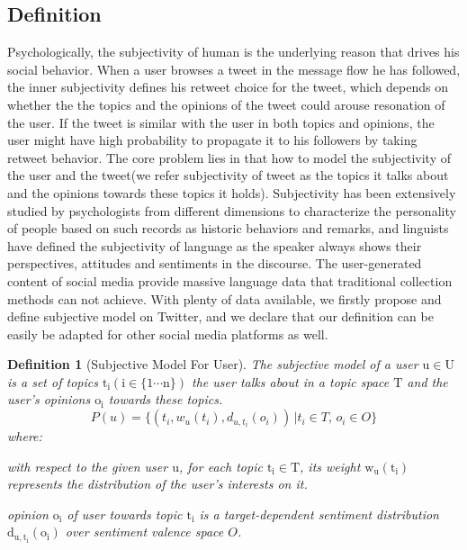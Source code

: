 \documentclass[preprint,times]{elsarticle}
\newtheorem{definition}{Definition}
\begin{document}
\subsection{Definition}
\label{definition}
Psychologically, the subjectivity of human is the underlying reason that drives his social behavior.
When a user browses a tweet in the message flow he has followed, the inner subjectivity defines his retweet choice for the tweet, which depends on whether the the topics and the opinions of the tweet could arouse resonation of the user.
If the tweet is similar with the user in both topics and opinions, the user might have high probability to propagate it to his followers by taking retweet behavior. 
The core problem lies in that how to model the subjectivity of the user and the tweet(we refer subjectivity of tweet as the topics it talks about and the opinions towards these topics it holds). 
Subjectivity has been extensively studied by psychologists from different dimensions to characterize the personality of people based on such records as historic behaviors and remarks\cite{Engbert2007}, and linguists have defined the subjectivity of language as the speaker always shows their perspectives, attitudes and sentiments in the discourse\cite{stein2005subjectivity}. 
The user-generated content of social media provide massive language data that traditional collection methods can not achieve.
With plenty of data available, we firstly propose and define subjective model on Twitter, and we declare that our definition can be easily be adapted for other social media platforms as well.
\begin{definition}[Subjective Model For User]
The subjective model of a user $\mathrm{u \in U}$ is a set of topics $\mathrm{t_{i} \left( i \in \lbrace1 \cdots n \rbrace \right) }$ 
the user talks about in a topic space $\mathrm{T}$ and the user's opinions $\mathrm{o_{i}}$ towards these topics.
\begin{equation}
\label{usermodel}
P \left( u \right) = \lbrace \left( t_{i}, w_{u} \left( t_{i} \right), d_{u,t_{i}} \left( o_{i} \right) \right) \,\vert  t_{i} \in T, \, o_{i} \in O \rbrace
\end{equation}
where:
\begin{itemize*}
\item with respect to the given user $\mathrm{u}$,  for each topic $\mathrm{t_{i} \in T}$, its  weight $\mathrm{ w_{u} \left( t_{i} \right)}$ represents the distribution of the user's interests on it.
\item opinion $\mathrm{o_{i}}$ of user towards topic $\mathrm{t_{i}}$ is a target-dependent sentiment distribution  $\mathrm{d_{u,t_{i}} \left( o_{i} \right)}$ over sentiment valence space $O$.
\end{itemize*}
\end{definition}
\end{document}
